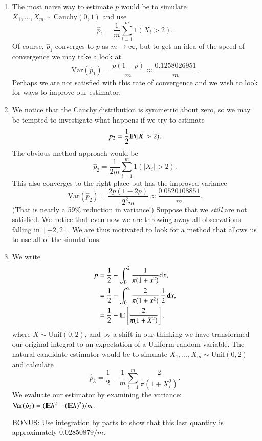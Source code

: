\documentclass[11pt,english]{scrbook}
\begin{document}
\begin{enumerate}
\item The most naive way to estimate \(p\) would be to simulate \(X_{1},\ldots,X_{m} \sim \mathrm{Cauchy}(0,1)\) and use 
\[
   \hat{p}_{1}=\frac{1}{m}\sum_{i=1}^{m}1(X_{i}>2).
   \]
Of course, \(\hat{p}_{1}\) converges to \(p\) as \(m\to\infty\), but to get an idea of the speed of convergence we may take a look at 
\[
   \mbox{Var}(\hat{p}_{1})=\frac{p(1-p)}{m}\approx\frac{0.1258026951}{m}.
   \]
Perhaps we are not satisfied with this rate of convergence and we wish to look for ways to improve our estimator.

\item We notice that the Cauchy distribution is symmetric about zero, so we may be tempted to investigate what happens if we try to estimate
\[
   p_{2}=\frac{1}{2}\P(|X|>2).
   \]
The obvious method approach would be 
\[
   \hat{p}_{2}=\frac{1}{2m}\sum_{i=1}^{m}1(|X_{i}|>2).
   \]
This also converges to the right place but has the improved variance
\[
   \mbox{Var}(\hat{p}_{2})=\frac{2p(1-2p)}{2^{2}m}\approx\frac{0.0520108851}{m}.
   \]
(That is nearly a 59\% reduction in variance!) Suppose that we \emph{still} are not satisfied. We notice that even now we are throwing away all observations falling in \([-2,2]\). We are thus motivated to look for a method that allows us to use all of the simulations.

\item We write 
\begin{align*}
p & =\frac{1}{2}-\int_{0}^{2}\frac{1}{\pi(1+x^{2})}\mathrm{d} x,\\
& =\frac{1}{2}-\int_{0}^{2}\frac{2}{\pi(1+x^{2})}\,\frac{1}{2}\,\mathrm{d} x,\\
& =\frac{1}{2}-\mathrm{I\hspace{-1.5pt}E}\left[\frac{2}{\pi(1+X^{2})}\right],
\end{align*}
where \(X\sim\mathrm{Unif}(0,2)\), and by a shift in our thinking we have transformed our original integral to an expectation of a Uniform random variable. The natural candidate estimator would be to simulate \(X_{1},\ldots,X_{m}\sim\mathrm{Unif}(0,2)\) and calculate
\[
   \hat{p}_{3}=\frac{1}{2}-\frac{1}{m}\sum_{i=1}^{m}\frac{2}{\pi(1+X_{i}^{2})}.
   \]
We evaluate our estimator by examining the variance: \(\mbox{Var}(\hat{p}_{3})=(\mathrm{I\hspace{-1.5pt}E} h^{2}-(\mathrm{I\hspace{-1.5pt}E} h)^{2})/m\).

\uline{BONUS:} Use integration by parts to show that this last quantity is approximately \(0.02850879/m\).


\end{enumerate}
\end{document}
